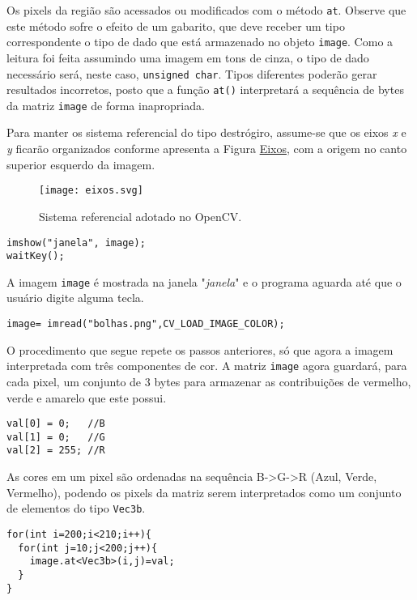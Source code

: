 \documentclass[11pt]{amsbook}
\begin{document}
Os pixels da região são acessados ou modificados com o método
\texttt{at}. Observe que este método sofre o efeito de um gabarito, que deve
receber um tipo correspondente o tipo de dado que está armazenado no
objeto \texttt{image}. Como a leitura foi feita assumindo uma imagem em tons
de cinza, o tipo de dado necessário será, neste caso, \texttt{unsigned
char}. Tipos diferentes poderão gerar resultados incorretos, posto que
a função \texttt{at()} interpretará a sequência de bytes da matriz \texttt{image} de
forma inapropriada.


Para manter os sistema referencial do tipo destrógiro, assume-se que
os eixos \emph{x} e \emph{y} ficarão organizados conforme apresenta a Figura
\hyperlink{fig-eixos}{Eixos}, com a origem no canto superior esquerdo da imagem.


\begin{figure}[h]{}
\centering\texttt{[image: eixos.svg]}
\caption{Sistema referencial adotado no OpenCV.}

\end{figure}

\begin{verbatim}
imshow("janela", image);
waitKey();
\end{verbatim}

A imagem \texttt{image} é mostrada na janela "\emph{janela}" e o programa aguarda
até que o usuário digite alguma tecla.


\begin{verbatim}
image= imread("bolhas.png",CV_LOAD_IMAGE_COLOR);
\end{verbatim}

O procedimento que segue repete os passos anteriores, só que agora a
imagem interpretada com três componentes de cor. A matriz \texttt{image}
agora guardará, para cada pixel, um conjunto de 3 bytes para armazenar
as contribuições de vermelho, verde e amarelo que este possui.


\begin{verbatim}
val[0] = 0;   //B
val[1] = 0;   //G
val[2] = 255; //R
\end{verbatim}

As cores em um pixel são ordenadas na sequência B->G->R (Azul, Verde,
Vermelho), podendo os pixels da matriz serem interpretados como um
conjunto de elementos do tipo \texttt{Vec3b}.


\begin{verbatim}
for(int i=200;i<210;i++){
  for(int j=10;j<200;j++){
    image.at<Vec3b>(i,j)=val;
  }
}
\end{verbatim}
\end{document}
